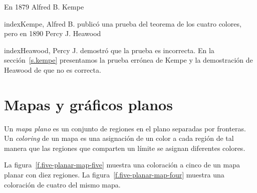 En 1879 Alfred B. Kempe{index{Kempe, Alfred B.} publicó una prueba del teorema de los cuatro colores, pero en 1890 Percy J. Heawood{index{Heawood, Percy J.} demostró que la prueba es incorrecta. En la sección~\ref{s.kempe} presentamos la prueba errónea de Kempe y la demostración de Heawood de que no es correcta.


\section{Mapas y gráficos planos}\label{s.planar}

\begin{definition}
Un \textit{mapa plano} es un conjunto de regiones en el plano separadas por fronteras. Un \textit{coloring} de un mapa es una asignación de un color a cada región de tal manera que las regiones que comparten un límite se asignan diferentes colores.
\end{definition}

La figura~\ref{f.five-planar-map-five} muestra una coloración a cinco de un mapa planar con diez regiones.
La figura~\ref{f.five-planar-map-four} muestra una coloración de cuatro del mismo mapa.

\begin{figure}[t]
\begin{minipage}{.45\textwidth}
\begin{center}
\end{center}
\end{minipage}
\end{figure}}}
